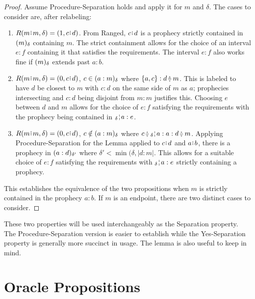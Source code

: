 \documentclass[12pt]{article}
\begin{document}
\begin{proof}
    Assume Procedure-Separation holds and apply it for $m$ and $\delta$. The cases to consider are, after relabeling:
    
    \begin{enumerate}
    \item $R(m \rint m, \delta) = (1, c \rint d)$. From Ranged, $c \rint d$ is a prophecy strictly contained in $\halo{m}$ containing $m$. The strict containment allows for the choice of an interval $e:f$ containing it that satisfies the requirements. The interval $e:f$ also works fine if $\halo{m}$ extends past $a:b$. 
    
    \item $R(m \rint m, \delta) = (0, c \rint d)$, $c \in \halo{a:m}$ where  $\{a, c\}: d \betneq m$. This is labeled to have $d$ be closest to $m$ with $c:d$ on the same side of $m$ as $a$; prophecies intersecting and $c:d$ being disjoint from $m:m$ justifies this. Choosing $e$ between $d$ and $m$ allows for the choice of $e:f$ satisfying the requirements with the prophecy being contained in $\fuzbleft{a}:e$.

    \item $R(m \rint m, \delta) = (0, c \rint d)$, $c \notin \halo{a:m}$ where  $c \betneq \fuzbleft{a} : a :  d \betneq m$. Applying Procedure-Separation for the Lemma applied to $c \rint d$ and $a \rint b$, there is a prophecy in $\halo[\delta']{a:d}$ where $\delta' < \min(\delta, |d:m|$. This allows for a suitable choice of $e:f$ satisfying the requirements with $\fuzbleft{a}:e$ strictly containing a prophecy.  
    
    \end{enumerate} 
    
    This establishes the equivalence of the two propositions when $m$ is strictly contained in the prophecy $a:b$. If $m$ is an endpoint, there are two distinct cases to consider. 

\end{proof}

These two properties will be used interchangeably as the Separation property. The Procedure-Separation version is easier to establish while the Yes-Separation property is generally more succinct in usage. The lemma is also useful to keep in mind. 



\section{Oracle Propositions}
\end{document}
